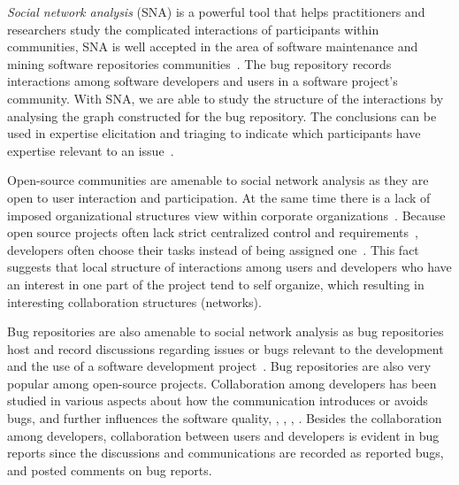 \documentclass[conference]{IEEEtran}
\begin{document}
\label{introduction}



\emph{Social network analysis} (SNA) is a powerful tool that helps
practitioners and researchers study the complicated interactions of
participants within communities, SNA is well accepted in the area of software maintenance and mining software repositories
communities~\cite{CAMB:wass,MSR:christ,ICSEsocio:meneely}.  
%
The bug repository records interactions among software developers and users in a software
project's community. With SNA, we are able to study the structure of the interactions by analysing the graph constructed for the bug repository.
%
The conclusions can be used in expertise elicitation and
triaging to indicate which  participants have expertise relevant
to an issue~\cite{ICSEsocio:meneely}. 


Open-source communities are amenable to social network analysis as
they are
open to user interaction and participation. 
At the same time there is a lack of imposed organizational
structures view within corporate organizations~\cite{ACM:chris}.
Because open source projects often lack strict centralized control and
requirements~\cite{AMCIS:Freeh}, developers often choose their
tasks instead of being assigned one~\cite{ACM:ashish}. 
This fact suggests that local structure of interactions among users and developers
who have an interest in one part of the project tend to self
organize, which resulting in interesting collaboration structures (networks).


Bug repositories are also amenable to social network analysis as bug
repositories host and record discussions regarding issues or bugs relevant to
the development and the use of a software development
project~\cite{ACM:ashish,OSD:yasu}. 
Bug repositories are also very popular among open-source projects.
Collaboration among developers has been studied in various aspects about how the communication introduces or avoids bugs, and further influences the software quality, \cite{CSMR:bernardi}, \cite{ACM:abreu}, \cite{ACM:pinzger}, \cite{IEEE:bettenburg}. 
Besides the collaboration among developers, collaboration between users and developers is evident in bug
reports since the discussions and communications are recorded as reported bugs, and posted comments
on bug reports.
\end{document}
